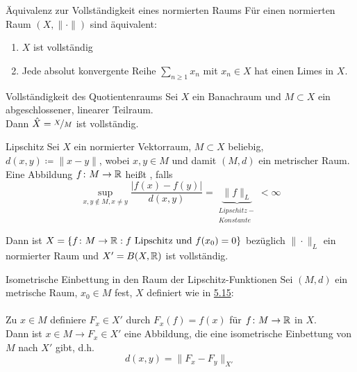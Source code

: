 	\begin{karte}{Äquivalenz zur Vollständigkeit eines normierten Raums}	
		Für einen normierten Raum $(X, \| \cdot \|)$ sind äquivalent:
		\begin{enumerate}[label=\alph*\upshape)]
			\item $X$ ist vollständig
			\item Jede absolut konvergente Reihe $\sum_{n \geq 1} x_{n}$ mit $x_{n} \in X$ hat einen Limes in $X$.
		\end{enumerate}	
	\end{karte}
	
	\begin{karte}{Vollständigkeit des Quotientenraums}	
		Sei $X$ ein Banachraum und $M \subset X$ ein abgeschlossener, linearer Teilraum. \\
		Dann $\hat X = \nicefrac{X}{M}$ ist vollständig.
	\end{karte}
	
	\begin{karte}{Lipschitz}	
		Sei $X$ ein normierter Vektorraum, $M \subset X$ beliebig, $d(x, y) \coloneqq \| x - y \|$, wobei $x, y \in M$ und damit $(M, d)$ ein metrischer Raum. \\
		Eine Abbildung $f \colon M \rightarrow \mathbb{R}$ hei{\ss}t , falls
		\[ \sup_{x, y \notin M, x \neq y} \frac{|f(x) - f(y)|}{d(x, y)} = \underbrace{\| f \|_{L}}_{\begin{matrix} Lipschitz- \\ Konstante \end{matrix}} < \infty \]
		
		Dann ist $X = \{ f \colon M \rightarrow \mathbb{R} : f \text{ Lipschitz und } f(x_{0}) = 0 \}$	
	bezüglich $\| \cdot \|_{L}$ ein normierter Raum und $X' = B(X, \mathbb{R})$ ist vollständig.
	\end{karte}

	\begin{karte}{Isometrische Einbettung in den Raum der Lipschitz-Funktionen}		
		Sei $(M,d)$ ein metrische Raum, $x_{0} \in M$ fest, $X$ definiert wie in \hyperref[def:5.15-	Lipschitz]{5.15}: \\ \\
		Zu $x \in M$ definiere $F_{x} \in X'$ durch $F_{x}(f) = f(x)$ für $f \colon M \rightarrow \mathbb{R}$ in $X$. \\
		Dann ist $x \in M \rightarrow F_{x} \in X'$ eine Abbildung, die eine isometrische Einbettung von $M$ nach $X'$ gibt, d.h. 
		\[ d(x, y) = \| F_{x} - F_{y} \|_{X'} \]
	\end{karte}
	
